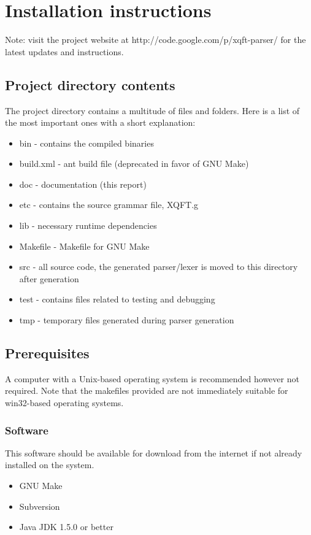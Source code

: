\chapter{Installation instructions}
Note: visit the project website at http://code.google.com/p/xqft-parser/
for the latest updates and instructions.

\section{Project directory contents}
The project directory contains a multitude of files and folders. Here is a list
of the most important ones with a short explanation:
\begin{itemize}
  \item bin - contains the compiled binaries
  \item build.xml - ant build file (deprecated in favor of GNU Make)
  \item doc - documentation (this report)
  \item etc - contains the source grammar file, XQFT.g
  \item lib - necessary runtime dependencies
  \item Makefile - Makefile for GNU Make
  \item src - all source code, the generated parser/lexer is moved to this
  directory after generation
  \item test - contains files related to testing and debugging
  \item tmp - temporary files generated during parser generation
\end{itemize}

\section{Prerequisites}
A computer with a Unix-based operating system is recommended however not
required. Note that the makefiles provided are not immediately suitable for
win32-based operating systems.

\subsection{Software}
This software should be available for download from the internet if not already
installed on the system.

\begin{itemize}
  \item GNU Make
  \item Subversion
  \item Java JDK 1.5.0 or better
\end{itemize}

